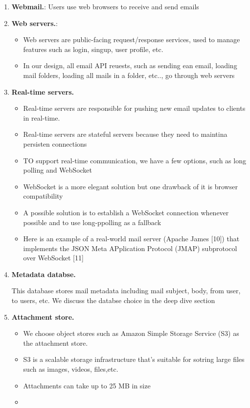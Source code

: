 \documentclass{report}
\theoremstyle{definition}
\begin{document}
\begin{enumerate}
\item

\textbf{Webmail.}: Users use web browsers to receive and send emails

\item
\textbf{Web servers.}:

\begin{itemize}
\item
Web servers are public-facing request/response services, used to manage features such as login, singup, user profile, etc.
\item
In our design, all email API reuests, such as sending ean email, loading mail folders, loading all mails in a folder, etc.., go through web servers
\end{itemize}

\item

\textbf{Real-time servers.}

\begin{itemize}
\item
Real-time servers are responsible for pushing new email updates to clients in real-time.
\item
Real-time servers are stateful servers because they need to maintina persisten connections
\item
TO support real-time communication, we have a few options, such as long polling and WebSocket
\item
WebSocket is a more elegant solution but one drawback of it is browser compatibility
\item
A possible solution is to establish a WebSocket connection whenever possible and to use long-ppolling as a fallback
\item
Here is an example of a real-world mail server (Apache James [10]) that implements the JSON Meta APplication Protocol (JMAP) subprotocol over WebSocket [11]
\end{itemize}

\item
\textbf{Metadata databse.}

This database stores mail metadata including mail subject, body, from user, to users, etc. We discuss the databse choice in the deep dive section
\item
\textbf{Attachment store.}

\begin{itemize}
\item
We choose object stores such as Amazon Simple Storage Service (S3) as the attachment store.
\item
S3 is a scalable storage infrastructure that's suitable for sotring large files such as images, videos, files,etc.
\item
Attachments can take up to 25 MB in size
\item
\end{itemize}
\end{enumerate}
\end{document}
